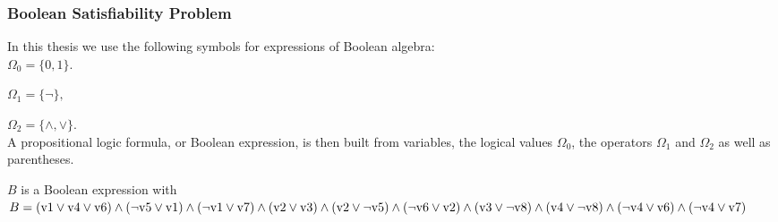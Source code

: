 \documentclass[a4paper, 12pt, bibliography=totoc]{scrartcl}
\begin{document}
\subsubsection{Boolean Satisfiability Problem}


In this thesis we use the following symbols for expressions of Boolean algebra:\\

${ \Omega _{0}=\{0 ,1 \}.}$ 

${\Omega _{1}=\{\lnot \},}$

${ \Omega _{2}= \{\land ,\lor \}.}$\\


A propositional logic formula, or Boolean expression, is then built from variables, the logical values $\Omega _{0}$, the operators $\Omega _{1}$ and $\Omega _{2}$ as well as parentheses.\\


\begin{example}\label{ex:booleanform}
	$B$ is a Boolean expression with\\
	
	$B = (\text{v1}\lor \text{v4}\lor \text{v6})\land (\neg \text{v5}\lor \text{v1})\land (\neg \text{v1}\lor \text{v7})\land (\text{v2}\lor \text{v3})\land (\text{v2}\lor \neg \text{v5})
	\land (\neg \text{v6}\lor \text{v2})\land \\
	(\text{v3}\lor \neg \text{v8})\land (\text{v4}\lor \neg \text{v8})\land (\neg \text{v4}\lor \text{v6})\land (\neg \text{v4}\lor \text{v7})$

\end{example}
\end{document}
